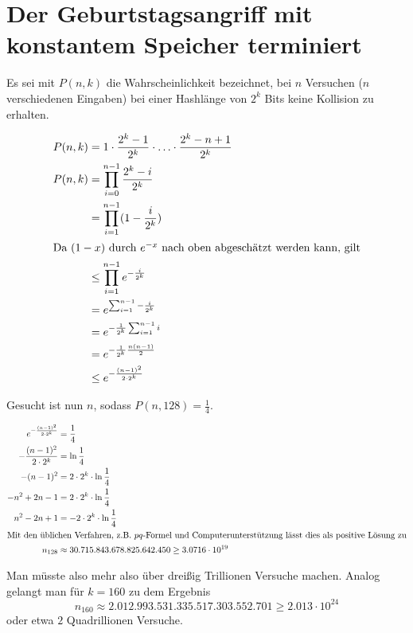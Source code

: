 \documentclass{../crypto}
\date{4. Dezember 2015}
\begin{document}
\maketitle

\section{Der Geburtstagsangriff mit konstantem Speicher terminiert}

Es sei mit $P(n,k)$ die Wahrscheinlichkeit bezeichnet, bei $n$ Versuchen ($n$
verschiedenen Eingaben) bei einer Hashlänge von $2^k$ Bits keine Kollision zu
erhalten.

\begin{align*}
   P(n,k)  & = 1 \cdot \frac{2^k - 1}{2^k} \cdot \ldots \cdot \frac{2^k - n + 1}{2^k} \\
   P(n,k)  & =   \prod_{i=0}^{n-1} \frac{2^k - i}{2^k}                                \\
           & =   \prod_{i=1}^{n-1} (1 -  \frac{i}{2^k})                               \\
\intertext{Da $(1-x)$ durch $e^{-x}$ nach oben abgeschätzt werden kann, gilt}
           & \le \prod_{i=1}^{n-1} e^{-\frac{i}{2^k}} \\
           & =   e^{\sum_{i=1}^{n-1}-\frac{i}{2^k}}   \\
           & =   e^{-\frac{1}{2^k}\sum_{i=1}^{n-1}i}  \\
           & =   e^{-\frac{1}{2^k} \frac{n(n-1)}{2}}  \\
           & \le   e^{-\frac{(n-1)^2}{2\cdot 2^k}}    \\
\end{align*}

Gesucht ist nun $n$, sodass $P(n,128) = \frac{1}{4}$.

\begin{align*}
   e^{-\frac{(n-1)^2}{2\cdot 2^k}} & = \frac{1}{4}                        \\
   -\frac{(n-1)^2}{2\cdot 2^k}     & = \ln{\frac{1}{4}}                   \\
   -(n-1)^2                        & = 2\cdot 2^k \cdot \ln{\frac{1}{4}}  \\
   -n^2 + 2n - 1                   & = 2\cdot 2^k \cdot \ln{\frac{1}{4}}  \\
   n^2 - 2n + 1                    & = -2\cdot 2^k \cdot \ln{\frac{1}{4}} \\
   \intertext{Mit den üblichen Verfahren, z.B. $pq$-Formel und
   Computerunterstützung lässt dies als positive Lösung zu}
   n_{128}                         & \approx 30.715.843.678.825.642.450 \ge 3.0716 \cdot 10^{19}
\end{align*}

Man müsste also mehr also über dreißig Trillionen
Versuche machen. Analog gelangt man für $k=160$ zu dem Ergebnis 
\begin{equation*}
   n_{160} \approx 2.012.993.531.335.517.303.552.701 \ge 2.013 \cdot 10^{24}
\end{equation*}
oder etwa $2$ Quadrillionen Versuche.
\end{document}
